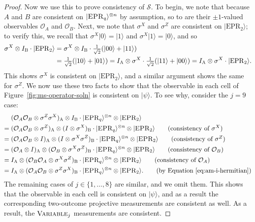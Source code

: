 \documentclass[11pt]{article}
\theoremstyle{definition}
\newcommand{\ket}[1]{|#1\rangle}
\newcommand{\strategy}{\mathscr{S}}
\newcommand{\labelstyle}[1]{\ensuremath{\textsc{#1}}\xspace}
\newcommand{\EPR}{\labelstyle{EPR}}
\newcommand{\alice}{\labelstyle{A}}
\newcommand{\bob}{\labelstyle{B}}
\newcommand{\typestyle}[1]{\ensuremath{\textsc{#1}}\xspace}
\newcommand{\Variable}{\typestyle{Variable}}
\renewcommand{\cal}[1]{\mathcal{#1}}
\begin{document}
\begin{proof}
  Now we use this to prove consistency of $\strategy$.
  To begin, we note that because $A$ and $B$ are consistent on $\ket{\EPR_q}^{\otimes n}$ by assumption,
  so to are their $\pm 1$-valued observables $\cal{O}_A$ and $\cal{O}_B$.
  Next, we note that $\sigma^X$ and $\sigma^Z$ are consistent on $\ket{\mathrm{EPR}_2}$;
  to verify this, we recall that $\sigma^X \ket{0} = \ket{1}$ and $\sigma^X \ket{1} = \ket{0}$, and so
  \begin{align*}
  \sigma^X \otimes I_{\bob} \cdot \ket{\mathrm{EPR}_2}
&  =   \sigma^X \otimes I_{\bob} \cdot \tfrac{1}{\sqrt{2}} (\ket{00} + \ket{11})\\
&  = \tfrac{1}{\sqrt{2}} (\ket{10} + \ket{01})
    =    I_{\alice} \otimes \sigma^X \cdot \tfrac{1}{\sqrt{2}} (\ket{11} + \ket{00})
    =    I_{\alice} \otimes \sigma^X \cdot \ket{\mathrm{EPR}_2}.
  \end{align*}
  This shows $\sigma^X$ is consistent on $\ket{\mathrm{EPR}_2}$,
  and a similar argument shows the same for $\sigma^Z$.
  We now use these two facts to show that the observable in each cell of
  Figure~\ref{fig:ms-operator-soln} is consistent on $\ket{\psi}$.
  To see why, consider the $j = 9$ case:
  \begin{align*}
&  (\cal{O}_A \cal{O}_B \otimes \sigma^Z \sigma^X)_\alice \otimes I_\bob
		\cdot \ket{\EPR_q}^{\otimes n} \otimes \ket{\EPR_2} \\
  ={}& (\cal{O}_A \cal{O}_B \otimes \sigma^Z)_\alice \otimes (I \otimes \sigma^X)_\bob
  		\cdot \ket{\EPR_q}^{\otimes n} \otimes \ket{\EPR_2}\tag{consistency of $\sigma^X$}\\
  ={}& (\cal{O}_A \cal{O}_B \otimes I)_\alice \otimes (I \otimes \sigma^X\sigma^Z)_\bob
  		\cdot \ket{\EPR_q}^{\otimes n} \otimes \ket{\EPR_2}\tag{consistency of $\sigma^Z$}\\
  ={}& (\cal{O}_A \otimes I)_\alice \otimes ( \cal{O}_B \otimes \sigma^X\sigma^Z)_\bob
  		\cdot \ket{\EPR_q}^{\otimes n} \otimes \ket{\EPR_2}\tag{consistency of $\cal{O}_B$}\\
  ={}& I_\alice \otimes (\cal{O}_B \cal{O}_A \otimes \sigma^X\sigma^Z)_\bob
  		\cdot \ket{\EPR_q}^{\otimes n} \otimes \ket{\EPR_2}\tag{consistency of $\cal{O}_A$}\\
  ={}& I_\alice \otimes (\cal{O}_A \cal{O}_B \otimes \sigma^Z \sigma^X)_\bob
  		\cdot \ket{\EPR_q}^{\otimes n} \otimes \ket{\EPR_2}. \tag{by Equation~\eqref{eq:am-i-hermitian}}
  \end{align*}
  The remaining cases of $j \in\{1, \ldots, 8\}$ are similar, and we omit them.
  This shows that the observable in each cell is consistent on $\ket{\psi}$,
  and as a result the corresponding two-outcome projective measurements are consistent as well.
  As a result, the $\Variable_j$ measurements are consistent.
  

\end{proof}
\end{document}
